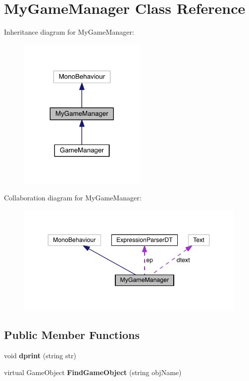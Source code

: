 \hypertarget{class_my_game_manager}{}\section{My\+Game\+Manager Class Reference}
\label{class_my_game_manager}


Inheritance diagram for My\+Game\+Manager\+:\nopagebreak
\begin{figure}[H]
\begin{center}
\leavevmode
\includegraphics[width=176pt]{class_my_game_manager__inherit__graph}
\end{center}
\end{figure}


Collaboration diagram for My\+Game\+Manager\+:\nopagebreak
\begin{figure}[H]
\begin{center}
\leavevmode
\includegraphics[width=344pt]{class_my_game_manager__coll__graph}
\end{center}
\end{figure}
\subsection*{Public Member Functions}
\begin{DoxyCompactItemize}
\item 
void {\bfseries dprint} (string str)\hypertarget{class_my_game_manager_a7498d9c1177c89078f8d07c65ce86758}{}\label{class_my_game_manager_a7498d9c1177c89078f8d07c65ce86758}

\item 
virtual Game\+Object {\bfseries Find\+Game\+Object} (string obj\+Name)\hypertarget{class_my_game_manager_acfde0ec2d568ae2b170ebe41b7c021a5}{}\label{class_my_game_manager_acfde0ec2d568ae2b170ebe41b7c021a5}

\end{DoxyCompactItemize}
